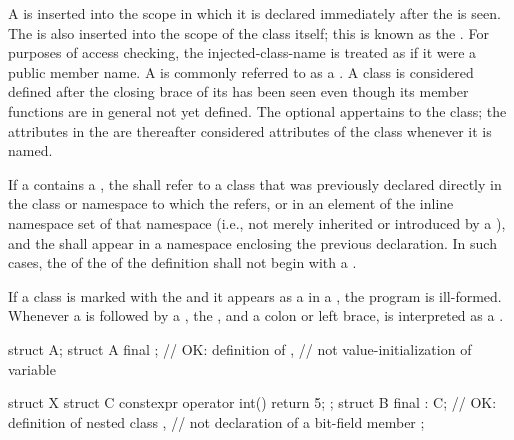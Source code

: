 \pnum
A  is inserted into the scope in which it is
declared immediately after the  is seen. The
 is also inserted into the scope of the class
itself; this is known as the .
For purposes of access checking, the injected-class-name is treated as
if it were a public member name.
A  is commonly referred to as a .
A class is considered defined after the closing brace of its
 has been seen even though its member
functions are in general not yet defined.
The optional  appertains to the class; the attributes in
the  are thereafter considered attributes of the class
whenever it is named.

\pnum
If a  contains a ,
the  shall refer to a class that was
previously declared directly in the class or namespace to which the
 refers,
or in an element of the inline namespace set of that namespace
(i.e., not merely inherited or
introduced by a ), and the
 shall appear in a namespace enclosing the
previous declaration.
In such cases, the  of the
 of the
definition shall not begin with a .

\pnum
If a class is marked with the   and it appears
as a  in a ,
the program is ill-formed. Whenever a
 is followed by a , the
 , and a colon or left brace,  is
interpreted as a .
\begin{example}
\begin{codeblock}
struct A;
struct A final {};      // OK: definition of ,
                        // not value-initialization of variable 

struct X {
 struct C { constexpr operator int() { return 5; } };
 struct B final : C{};  // OK: definition of nested class ,
                        // not declaration of a bit-field member 
};
\end{codeblock}
\end{example}

